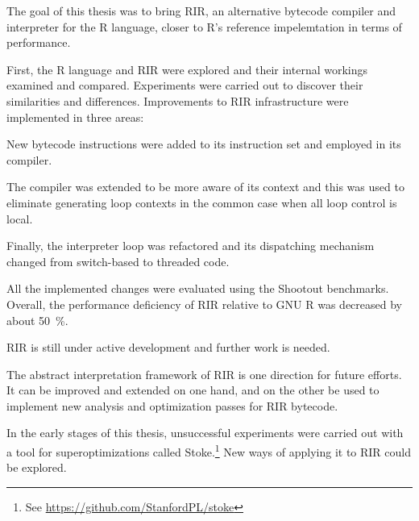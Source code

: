 The goal of this thesis was to bring RIR, an alternative bytecode compiler and interpreter for the R language, closer to R's reference impelemtation in terms of performance.

First, the R language and RIR were explored and their internal workings examined and compared. Experiments were carried out to discover their similarities and differences. Improvements to RIR infrastructure were implemented in three areas:

New bytecode instructions were added to its instruction set and employed in its compiler.

The compiler was extended to be more aware of its context and this was used to eliminate generating loop contexts in the common case when all loop control is local.

Finally, the interpreter loop was refactored and its dispatching mechanism changed from switch-based to threaded code.

All the implemented changes were evaluated using the Shootout benchmarks. Overall, the performance deficiency of RIR relative to GNU R was decreased by about 50~\%.

RIR is still under active development and further work is needed. 



The abstract interpretation framework of RIR is one direction for future efforts. It can be improved and extended on one hand, and on the other be used to implement new analysis and optimization passes for RIR bytecode.

In the early stages of this thesis, unsuccessful experiments were carried out with a tool for superoptimizations called Stoke.\footnote{See \url{https://github.com/StanfordPL/stoke}} New ways of applying it to RIR could be explored.

